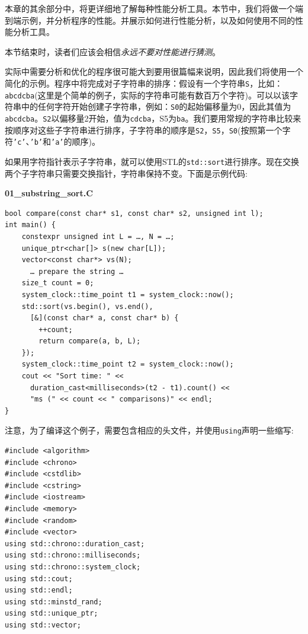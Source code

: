 
本章的其余部分中，将更详细地了解每种性能分析工具。本节中，我们将做一个端到端示例，并分析程序的性能。并展示如何进行性能分析，以及如何使用不同的性能分析工具。

本节结束时，读者们应该会相信\textit{永远不要对性能进行猜测}。

实际中需要分析和优化的程序很可能大到要用很篇幅来说明，因此我们将使用一个简化的示例。程序中将完成对子字符串的排序：假设有一个字符串\texttt{S}，比如：\texttt{abcdcba}(这里是个简单的例子，实际的字符串可能有数百万个字符)。可以以该字符串中的任何字符开始创建子字符串，例如：\texttt{S0}的起始偏移量为0，因此其值为\texttt{abcdcba}。\texttt{S2}以偏移量2开始，值为\texttt{cdcba}，S5为\texttt{ba}。我们要用常规的字符串比较来按顺序对这些子字符串进行排序，子字符串的顺序是\texttt{S2}，\texttt{S5}，\texttt{S0}(按照第一个字符\texttt{'c'}、\texttt{'b'}和\texttt{'a'}的顺序)。

如果用字符指针表示子字符串，就可以使用STL的\texttt{std::sort}进行排序。现在交换两个子字符串只需要交换指针，字符串保持不变。下面是示例代码:

\noindent
\textbf{01\_substring\_sort.C}
\begin{lstlisting}[style=styleCXX]
bool compare(const char* s1, const char* s2, unsigned int l);
int main() {
	constexpr unsigned int L = …, N = …;
	unique_ptr<char[]> s(new char[L]);
	vector<const char*> vs(N);
	  … prepare the string …
	size_t count = 0;
	system_clock::time_point t1 = system_clock::now();
	std::sort(vs.begin(), vs.end(),
	  [&](const char* a, const char* b) {
		++count;
		return compare(a, b, L);
	});
	system_clock::time_point t2 = system_clock::now();
	cout << "Sort time: " <<
	  duration_cast<milliseconds>(t2 - t1).count() <<
	  "ms (" << count << " comparisons)" << endl;
}
\end{lstlisting}

注意，为了编译这个例子，需要包含相应的头文件，并使用\texttt{using}声明一些缩写:

\begin{lstlisting}[style=styleCXX]
#include <algorithm>
#include <chrono>
#include <cstdlib>
#include <cstring>
#include <iostream>
#include <memory>
#include <random>
#include <vector>
using std::chrono::duration_cast;
using std::chrono::milliseconds;
using std::chrono::system_clock;
using std::cout;
using std::endl;
using std::minstd_rand;
using std::unique_ptr;
using std::vector;
\end{lstlisting}

